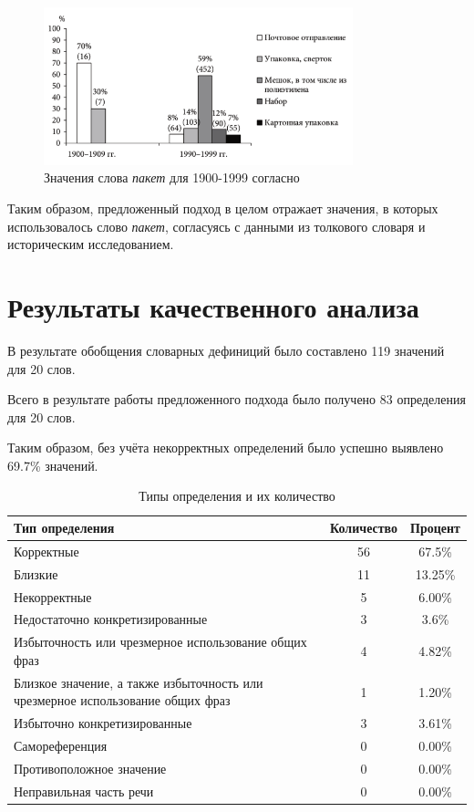 \documentclass[LI,VKR]{HSEUniversity}
\begin{document}
\begin{figure}[H]
    \centering %
    \includegraphics[width=0.8\textwidth]{img/book/paket/1900-1999}
    \caption{Значения слова \textit{пакет} для 1900-1999 согласно~\cite{TwoCenturies}}
    \label{TwoCenturiesPaket}
\end{figure}

Таким образом, предложенный подход в целом отражает значения, в которых использовалось
слово \textit{пакет}, согласуясь с данными из толкового словаря и историческим исследованием.

\section{Результаты качественного анализа}

В результате обобщения словарных дефиниций было составлено 119 значений для 20 слов.

Всего в результате работы предложенного подхода было получено 83 определения для 20 слов. %

Таким образом, без учёта некорректных определений было успешно выявлено
69.7\% значений.

\begin{table}[H]
\centering
\caption{Типы определения и их количество}
\begin{tabular}{|>{\raggedright\arraybackslash}p{8cm}|c|c|}
\hline
\textbf{Тип определения} & \textbf{Количество} & \textbf{Процент} \\ \hline
Корректные & 56 & 67.5\% \\ \hline %
Близкие & 11 & 13.25\% \\ \hline %
Некорректные & 5 & 6.00\% \\ \hline %
Недостаточно конкретизированные & 3 & 3.6\% \\ \hline %
Избыточность или чрезмерное использование общих фраз & 4 & 4.82\% \\ \hline
Близкое значение, а также избыточность или чрезмерное использование общих фраз & 1 & 1.20\% \\ \hline
Избыточно конкретизированные & 3 & 3.61\% \\ \hline
Самореференция & 0 & 0.00\% \\ \hline
Противоположное значение & 0 & 0.00\% \\ \hline
Неправильная часть речи & 0 & 0.00\% \\ \hline
\end{tabular}
\end{table}
\end{document}
